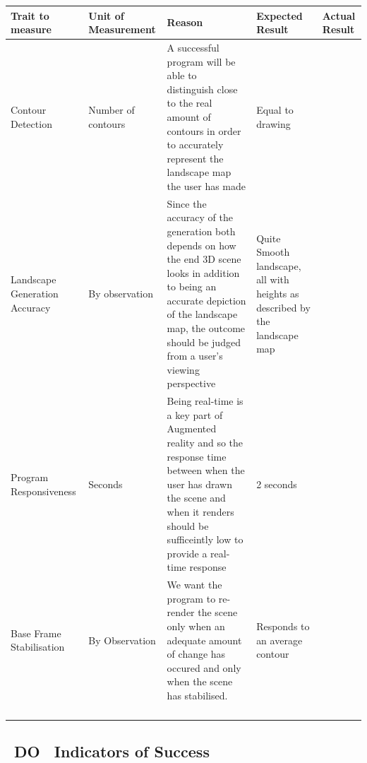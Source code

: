 \documentclass[11pt]{article}
\begin{document}
\begin{table}[h]
\begin{tabular}{lllll}
Trait to measure & Unit of Measurement & Reason & Expected Result & Actual Result \\
\hline \hline
Contour Detection&  Number of contours & A successful program will be able to 
										distinguish close to the real amount of 
										contours in order to accurately represent the	
										landscape map the user 
													has made      & Equal to drawing&  			  \\
Landscape Generation
	Accuracy     & By observation	   & Since the accuracy of the generation both
										 depends on how the end 3D scene looks in 
										 addition to being an accurate depiction of
										 the landscape map, the outcome should be 
										 judged from a user's viewing perspective
										        & Quite Smooth landscape,
										          all with heights as described by
										          the landscape map &  			  \\
Program Responsiveness &  Seconds      & Being real-time is a key part of Augmented
									  	 reality and so the response time between 
									  	 when the user has drawn the scene and when it
									  	 renders should be sufficeintly low to 
									  	 provide a real-time response
									  	        &     2 seconds       &  			  \\
Base Frame 
   Stabilisation & By Observation	   & We want the program to re-render the scene
   										 only when an adequate amount of change has 
   										 occured and only when the scene has 
   										 stabilised. & Responds to an average contour    &  			  \\
              
                 &                     &        &                 &  			  \\
                 &                     &        &                 &  			  \\
                 &                     &        &                 &  			  \\                                                                                                     
                 &                     &        &                 & 
\end{tabular}
\label{fig:TestMeasureTable}
\end{table}

\subsection{~DO~ Indicators of Success}
\end{document}
